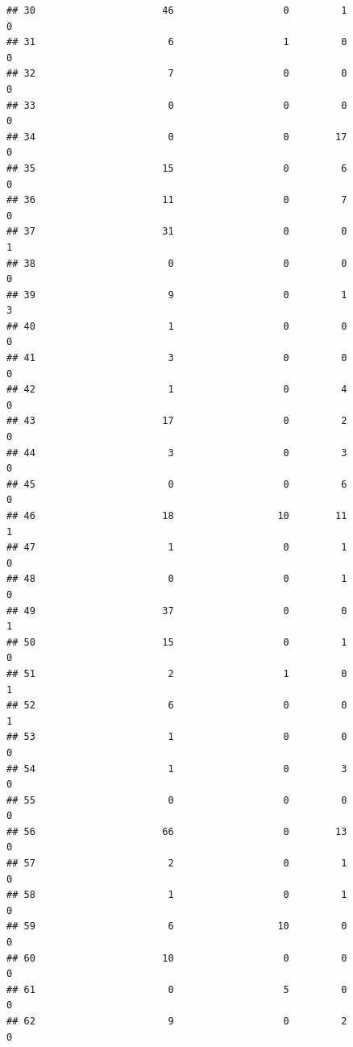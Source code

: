 \documentclass[
]{article}
\begin{document}
\begin{verbatim}
## 30                      46                   0         1                  0
## 31                       6                   1         0                  0
## 32                       7                   0         0                  0
## 33                       0                   0         0                  0
## 34                       0                   0        17                  0
## 35                      15                   0         6                  0
## 36                      11                   0         7                  0
## 37                      31                   0         0                  1
## 38                       0                   0         0                  0
## 39                       9                   0         1                  3
## 40                       1                   0         0                  0
## 41                       3                   0         0                  0
## 42                       1                   0         4                  0
## 43                      17                   0         2                  0
## 44                       3                   0         3                  0
## 45                       0                   0         6                  0
## 46                      18                  10        11                  1
## 47                       1                   0         1                  0
## 48                       0                   0         1                  0
## 49                      37                   0         0                  1
## 50                      15                   0         1                  0
## 51                       2                   1         0                  1
## 52                       6                   0         0                  1
## 53                       1                   0         0                  0
## 54                       1                   0         3                  0
## 55                       0                   0         0                  0
## 56                      66                   0        13                  0
## 57                       2                   0         1                  0
## 58                       1                   0         1                  0
## 59                       6                  10         0                  0
## 60                      10                   0         0                  0
## 61                       0                   5         0                  0
## 62                       9                   0         2                  0

\end{verbatim}
\end{document}
